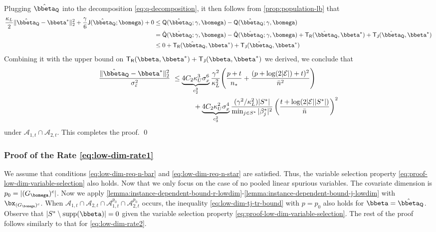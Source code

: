\documentclass[10pt]{article}
\numberwithin{equation}{section}
\newcommand*{\supp}{\mathrm{supp}}
\begin{document}
Plugging $\hat{\bbeta}_{\mathsf{Q}}$ into the decomposition \eqref{eq:q-decomposition}, it then follows from \cref{prop:population-lb} that
\begin{align*}
    \frac{\kappa_L}{2}\|\hat{\bbeta}_{\mathsf{Q}} - \bbeta^*\|_2^2 + \frac{\gamma}{6} \mathsf{J}(\hat{\bbeta}_{\mathsf{Q}}; \bomega) + 0 &\le \mathsf{Q}(\hat{\bbeta}_{\mathsf{Q}};\gamma, \bomega) - \mathsf{Q}(\hat{\bbeta}_{\mathsf{Q}};\gamma, \bomega) \\
    &= \hat{\mathsf{Q}}(\hat{\bbeta}_{\mathsf{Q}};\gamma, \bomega) - \hat{\mathsf{Q}}(\hat{\bbeta}_{\mathsf{Q}};\gamma, \bomega) + \mathsf{T}_{\mathsf{R}}(\hat{\bbeta}_{\mathsf{Q}},\bbeta^*) + \mathsf{T}_{\mathsf{J}}(\hat{\bbeta}_{\mathsf{Q}}, \bbeta^*) \\
    &\le 0 + \mathsf{T}_{\mathsf{R}}(\hat{\bbeta}_{\mathsf{Q}},\bbeta^*) + \mathsf{T}_{\mathsf{J}}(\hat{\bbeta}_{\mathsf{Q}}, \bbeta^*)
\end{align*} Combining it with the upper bound on $\mathsf{T}_{\mathsf{R}}(\bbeta,\bbeta^*) + \mathsf{T}_{\mathsf{J}}(\bbeta, \bbeta^*)$ we derived, we conclude that
\begin{align}
\label{eq:low-dim-faster-rate-c2-4}
\begin{split}
    \frac{\|\hat{\bbeta}_{\mathsf{Q}} - \bbeta^*\|_2^2}{\sigma_\varepsilon^2} &~\le  \underbrace{4C_2\kappa_U^3 \sigma_x^6}_{c_2^2} \frac{\gamma^2}{\kappa_L^2} \Bigg( \frac{p + t}{n_*} + \frac{(p + \log(2|\mathcal{E}|) + t)^2}{\bar{n}^2}\Bigg)\\
    &~~~~~~~~~~ + \underbrace{4C_2\kappa_U^2 \sigma_x^4}_{c_3^2} \frac{(\gamma^2/\kappa_L^2)|S^*|}{\min_{j\in S^*} |\beta_j^*|^2} \left(\frac{t + \log(2|\mathcal{E}||S^*|)}{\bar{n}}\right)^2
\end{split}
\end{align} under $\mathcal{A}_{1,t}\cap \mathcal{A}_{2,t}$. This completes the proof. \qed

\subsubsection{Proof of the Rate \eqref{eq:low-dim-rate1}}


We assume that conditions \eqref{eq:low-dim-req-n-bar} and \eqref{eq:low-dim-req-n-star} are satisfied. Thus, the variable selection property \eqref{eq:proof-low-dim-variable-selection} also holds. Now that we only focus on the case of no pooled linear spurious variables. The covariate dimension is $p_0 = |(G_{\bomega})^c|$. Now we apply \cref{lemma:instance-dependent-bound-r-lowdim}-\ref{lemma:instance-dependent-bound-j-lowdim} with $\bx_{(G_{\bomega})^c}$. When $\mathcal{A}_{1,t} \cap \mathcal{A}_{2,t} \cap \mathcal{A}_{1,t}^{p_0} \cap \mathcal{A}_{2,t}^{p_0}$ occurs, the inequality 
\eqref{eq:low-dim-tj-tr-bound} with $p=p_0$ also holds for $\bbeta = \hat{\bbeta}_\mathsf{Q}$. Observe that $|S^* \setminus \supp(\bbeta)|=0$ given the variable selection property \eqref{eq:proof-low-dim-variable-selection}. The rest of the proof follows similarly to that for \eqref{eq:low-dim-rate2}.
\end{document}
